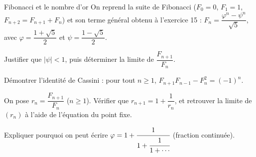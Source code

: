 \begin{exercice}[3]{Fibonacci et le nombre d'or}
On reprend la suite de Fibonacci ($F_0=0$, $F_1=1$,
$F_{n+2}=F_{n+1}+F_n$) et son terme général obtenu à l'exercice 15 :
$F_n=\dfrac{\varphi^{n}-\psi^{n}}{\sqrt5}$, avec
$\varphi=\dfrac{1+\sqrt5}{2}$ et $\psi=\dfrac{1-\sqrt5}{2}$.
\begin{questions}
  \item Justifier que $|\psi|<1$, puis déterminer la limite de
    $\dfrac{F_{n+1}}{F_n}$.
  \item Démontrer l'identité de Cassini : pour tout $n\geq1$,
    $F_{n+1}F_{n-1}-F_n^{2}=(-1)^{n}$.
  \item On pose $r_n=\dfrac{F_{n+1}}{F_n}$ ($n\geq1$). Vérifier que
    $r_{n+1}=1+\dfrac{1}{r_n}$, et retrouver la limite de $(r_n)$ à l'aide
    de l'équation du point fixe.
  \item Expliquer pourquoi on peut écrire
    $\varphi=1+\cfrac{1}{1+\cfrac{1}{1+\cdots}}$ (fraction continuée).
\end{questions}
\end{exercice}


